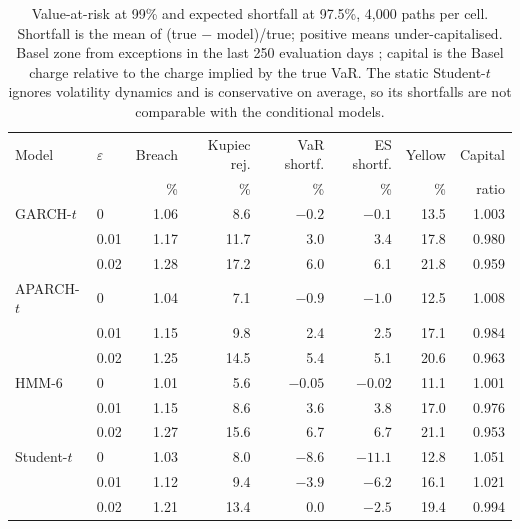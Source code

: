 \documentclass[11pt,a4paper]{article}
\theoremstyle{definition}
\theoremstyle{remark}
\begin{document}
\begin{table}[ht]\centering\footnotesize\setlength{\tabcolsep}{4pt}
\caption{Value-at-risk at 99\% and expected shortfall at 97.5\%, 4{,}000 paths per cell. Shortfall is the mean of (true $-$ model)/true; positive means under-capitalised. Basel zone from exceptions in the last 250 evaluation days \citep{basel1996}; capital is the Basel charge relative to the charge implied by the true VaR. The static Student-$t$ ignores volatility dynamics and is conservative on average, so its shortfalls are not comparable with the conditional models.}\label{tab:var}
\begin{tabular}{llrrrrrr}
\toprule
Model & $\varepsilon$ & Breach & Kupiec rej. & VaR shortf. & ES shortf. & Yellow & Capital\\
 & & \% & \% & \% & \% & \% & ratio\\
\midrule
GARCH-$t$ & 0 & 1.06 & 8.6 & $-0.2$ & $-0.1$ & 13.5 & 1.003\\
 & 0.01 & 1.17 & 11.7 & 3.0 & 3.4 & 17.8 & 0.980\\
 & 0.02 & 1.28 & 17.2 & 6.0 & 6.1 & 21.8 & 0.959\\
\addlinespace
APARCH-$t$ & 0 & 1.04 & 7.1 & $-0.9$ & $-1.0$ & 12.5 & 1.008\\
 & 0.01 & 1.15 & 9.8 & 2.4 & 2.5 & 17.1 & 0.984\\
 & 0.02 & 1.25 & 14.5 & 5.4 & 5.1 & 20.6 & 0.963\\
\addlinespace
HMM-6 & 0 & 1.01 & 5.6 & $-0.05$ & $-0.02$ & 11.1 & 1.001\\
 & 0.01 & 1.15 & 8.6 & 3.6 & 3.8 & 17.0 & 0.976\\
 & 0.02 & 1.27 & 15.6 & 6.7 & 6.7 & 21.1 & 0.953\\
\addlinespace
Student-$t$ & 0 & 1.03 & 8.0 & $-8.6$ & $-11.1$ & 12.8 & 1.051\\
 & 0.01 & 1.12 & 9.4 & $-3.9$ & $-6.2$ & 16.1 & 1.021\\
 & 0.02 & 1.21 & 13.4 & 0.0 & $-2.5$ & 19.4 & 0.994\\
\bottomrule
\end{tabular}
\end{table}
\end{document}
